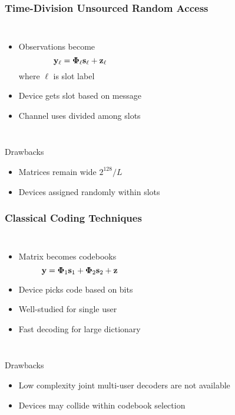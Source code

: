 
\begin{frame}
\frametitle{Time-Division Unsourced Random Access}
\begin{columns}
  \begin{itemize}
  \item Observations become
  \begin{equation*}
  \mathbf{y}_{\ell} = \boldsymbol{\Phi}_{\ell} \mathbf{s}_{\ell} + \mathbf{z}_{\ell}
  \end{equation*}
  where $\ell$ is slot label
  \item Device gets slot based on message
  \item Channel uses divided among slots
  \end{itemize}
  \hspace{-1cm} \scalebox{0.75}{}
\end{columns}
\vfill
\begin{alertblock}{Drawbacks}
  \begin{itemize}
  \item Matrices remain wide $2^{128}/L$
  \item Devices assigned randomly within slots
  \end{itemize}
\end{alertblock}
\end{frame}


\begin{frame}
\frametitle{Classical Coding Techniques}
\begin{columns}
  \begin{itemize}
  \item Matrix becomes codebooks
  \begin{equation*}
  \mathbf{y} = \boldsymbol{\Phi}_1 \mathbf{s}_1 + \boldsymbol{\Phi}_2 \mathbf{s}_2 + \mathbf{z}
  \end{equation*}
  \item Device picks code based on bits
  \item Well-studied for single user
  \item Fast decoding for large dictionary
  \end{itemize}
  \hspace{-1cm} \scalebox{0.75}{}
\end{columns}
\vfill
\begin{alertblock}{Drawbacks}
  \begin{itemize}
  \item Low complexity joint multi-user decoders are not available
  \item Devices may collide within codebook selection
  \end{itemize}
\end{alertblock}
\end{frame}

